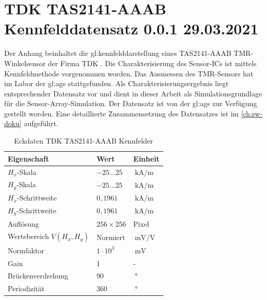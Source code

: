 %

\chapter{TDK TAS2141-AAAB Kennfelddatensatz 0.0.1 29.03.2021}\label{ch:tdk-datensatz}

Der Anhang beinhaltet die \gls{gl:kennfeld}darstellung eines TAS2141-AAAB TMR-Winkelsensor der Firma TDK \cite{TDK2016}. Die Charakterisierung des Sensor-ICs ist mittels Kennfeldmethode \cite{Schuethe2019} vorgenommen worden. Das Ausmessen des TMR-Sensors hat im Labor der \gls{gl:ags} stattgefunden. Als Charakterisierungsergebnis liegt entsprechender Datensatz vor und dient in dieser Arbeit als Simulationsgrundlage für die Sensor-Array-Simulation. Der Datensatz ist von der \gls{gl:ags} zur Verfügung gestellt worden. Eine detaillierte Zusammensetzung des Datensatzes ist im \autoref{ch:sw-doku} aufgeführt.


\vspace{5mm}
\begin{table}[!htbp]
	\centering
	\begin{tabular}{l l l}
		\toprule
		\textbf{Eigenschaft}      & \textbf{Wert}    & \textbf{Einheit}                \\ \midrule
		$H_x$-Skala               & $-25 \ldots 25$  & $\SI{}{\kilo\ampere\per\metre}$ \\
		$H_y$-Skala               & $-25 \ldots 25$  & $\SI{}{\kilo\ampere\per\metre}$ \\ \hline
		$H_x$-Schrittweite        & $0,1961$         & $\SI{}{\kilo\ampere\per\metre}$ \\
		$H_y$-Schrittweite        & $0,1961$         & $\SI{}{\kilo\ampere\per\metre}$ \\ \hline
		Auflösung                 & $256 \times 256$ & Pixel                           \\
		Wertebereich $V(H_x,H_y)$ & Normiert         & $\SI{}{\milli\volt\per\volt}$   \\ \hline
		Normfaktor                & $1\cdot 10^3$    & $\SI{}{\milli\volt}$            \\
		Gain                      & 1                & -                               \\ \hline
		Brückenverdrehung         & 90               & $\SI{}{\degree}$                \\
		Periodizität              & 360              & $\SI{}{\degree}$                \\ \bottomrule
	\end{tabular}%
	\caption[Eckdaten TDK TAS2141-AAAB Kennfelder]{Eckdaten TDK TAS2141-AAAB Kennfelder}
\label{tab:tdk-char-data}
\end{table}


